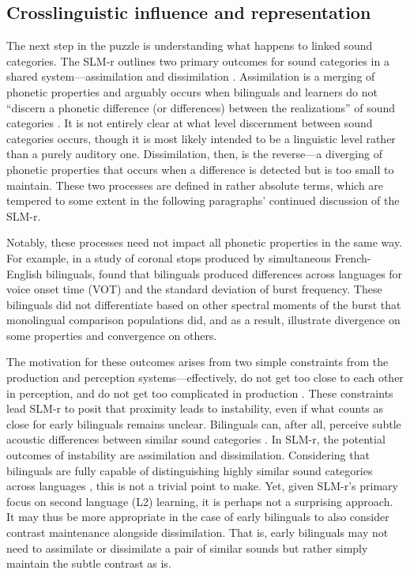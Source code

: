 \subsection{Crosslinguistic influence and representation}\label{ch4:sec:cli}

The next step in the puzzle is understanding what happens to linked sound categories. The SLM-r outlines two primary outcomes for sound categories in a shared system---assimilation and dissimilation \citep{flege_2021_slmr}. Assimilation is a merging of phonetic properties and arguably occurs when bilinguals and learners do not ``discern a phonetic difference (or differences) between the realizations'' of sound categories \citep[][p. 40]{flege_2021_slmr}. It is not entirely clear at what level discernment between sound categories occurs, though it is most likely intended to be a linguistic level rather than a purely auditory one. Dissimilation, then, is the reverse---a diverging of phonetic properties that occurs when a difference is detected but is too small to maintain. These two processes are defined in rather absolute terms, which are tempered to some extent in the following paragraphs' continued discussion of the SLM-r. 

Notably, these processes need not impact all phonetic properties in the same way. For example, in a study of coronal stops produced by simultaneous French-English bilinguals, \citet{sundara_2006_production} found that bilinguals produced differences across languages for voice onset time (VOT) and the standard deviation of burst frequency. These bilinguals did not differentiate based on other spectral moments of the burst that monolingual comparison populations did, and as a result, \citet{sundara_2006_production} illustrate divergence on some properties and convergence on others. 

The motivation for these outcomes arises from two simple constraints from the production and perception systems---effectively, do not get too close to each other in perception, and do not get too complicated in production \citep{guion_2003_systems, lindblom_1988_universals, flege_2021_slmr}. These constraints lead SLM-r to posit that proximity leads to instability, even if what counts as close for early bilinguals remains unclear. Bilinguals can, after all, perceive subtle acoustic differences between similar sound categories \citep{ju_2004_falling}. In SLM-r, the potential outcomes of instability are assimilation and dissimilation. Considering that bilinguals are fully capable of distinguishing highly similar sound categories across languages \citep[e.g.,][]{sundara_2006_production, lein_2016_vot, casillas_2021_interlingual}, this is not a trivial point to make. Yet, given SLM-r's primary focus on second language (L2) learning, it is perhaps not a surprising approach. It may thus be more appropriate in the case of early bilinguals to also consider contrast maintenance alongside dissimilation. That is, early bilinguals may not need to assimilate or dissimilate a pair of similar sounds but rather simply maintain the subtle contrast as is. 

